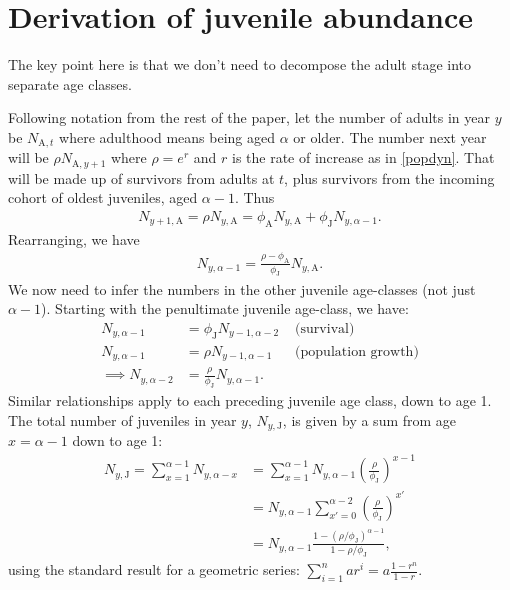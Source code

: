 \section{Derivation of juvenile abundance\label{sec:Deriv-Njy}}

The key point here is that we don't need to decompose the adult stage
into separate age classes.

Following notation from the rest of the paper, let the number of adults
in year $y$ be $N_{\text{A},t}$ where adulthood means being aged
$\alpha$ or older. The number next year will be $\rho N_{\text{A},y+1}$
where $\rho=e^{r}$ and $r$ is the rate of increase as in \eqref{popdyn}.
That will be made up of survivors from adults at $t$, plus survivors
from the incoming cohort of oldest juveniles, aged $\alpha-1$. Thus
\begin{gather}
N_{y+1,\text{A}}=\rho N_{y,\text{A}}=\phi_{\text{A}}N_{y,\text{A}}+\phi_{\text{J}}N_{y,\alpha-1}.\label{eq:mvb-nj-1}
\end{gather}
Rearranging, we have
\begin{gather}
N_{y,\alpha-1}=\frac{\rho-\phi_{\text{A}}}{\phi_{\text{J}}}N_{y,\text{A}}.\label{eq:mvb-nj-final-juve}
\end{gather}
We now need to infer the numbers in the other juvenile age-classes
(not just $\alpha-1$). Starting with the penultimate juvenile age-class,
we have: 
\begin{align*}
N_{y,\alpha-1} & =\phi_{\text{J}}N_{y-1,\alpha-2} & \text{ (survival)}\\
N_{y,\alpha-1} & =\rho N_{y-1,\alpha-1} & \text{ (population growth)}\\
\implies N_{y,\alpha-2} & =\frac{\rho}{\phi_{\text{J}}}N_{y,\alpha-1}.
\end{align*}
Similar relationships apply to each preceding juvenile age class,
down to age 1. The total number of juveniles in year $y$, $N_{y,\text{J}}$,
is given by a sum from age $x=\alpha-1$ down to age 1:
\begin{align}
N_{y,\text{J}}=\sum_{x=1}^{\alpha-1}N_{y,\alpha-x} & =\sum_{x=1}^{\alpha-1}N_{y,\alpha-1}\left(\frac{\rho}{\phi_{\text{J}}}\right)^{x-1}\nonumber \\
 & =N_{y,\alpha-1}\sum_{x'=0}^{\alpha-2}\left(\frac{\rho}{\phi_{\text{J}}}\right)^{x'}\nonumber \\
 & =N_{y,\alpha-1}\frac{1-\left(\rho/\phi_{\text{J}}\right)^{\alpha-1}}{1-\rho/\phi_{\text{J}}},\label{eq:mvb-nj-totjuve}
\end{align}
using the standard result for a geometric series: $\sum_{i=1}^{n}ar^{i}=a\frac{1-r^{n}}{1-r}$.
